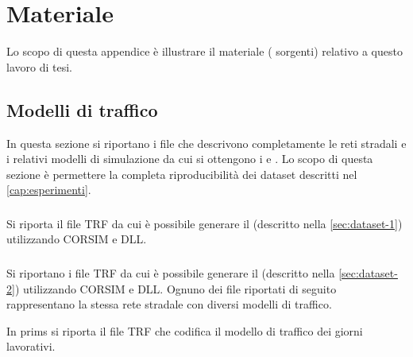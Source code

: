 
\chapter{Materiale}
\label{cap:stuff}

Lo scopo di questa appendice è illustrare il materiale (\eg{} sorgenti) relativo a questo lavoro di tesi.

\section{Modelli di traffico}\label{sec:trf-files}

In questa sezione si riportano i file che descrivono completamente le reti stradali e i relativi modelli di simulazione da cui si ottengono i  e . Lo scopo di questa sezione è permettere la completa riproducibilità dei dataset descritti nel \autoref{cap:esperimenti}.

\subsection{}\label{sec:trf-1}

Si riporta il file \acs{TRF} da cui è possibile generare il  (descritto nella \vref{sec:dataset-1}) utilizzando \acs{CORSIM} e  \acs{DLL}.


\subsection{}\label{sec:trf-2}

Si riportano i file \acs{TRF} da cui è possibile generare il  (descritto nella \vref{sec:dataset-2}) utilizzando \acs{CORSIM} e  \acs{DLL}. Ognuno dei file riportati di seguito rappresentano la stessa rete stradale con diversi modelli di traffico.

In prims si riporta il file \acs{TRF} che codifica il modello di traffico dei giorni lavorativi.

